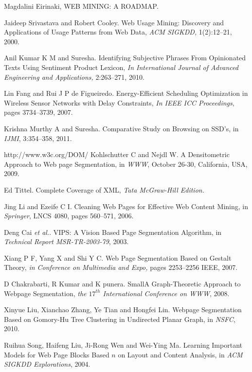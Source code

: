 \documentclass[fleqn,twoside]{article}
\begin{document}
\begin{thebibliography}{00}
Magdalini Eirinaki, WEB MINING: A ROADMAP.

{Jaideep Srivastava and Robert Cooley}. {Web Usage Mining: Discovery and Applications of Usage Patterns from Web Data}, {\it ACM SIGKDD,} 1(2):12--21,  2000.

{Anil Kumar K M and  Suresha}.
{Identifying Subjective Phrases From Opinionated Texts Using Sentiment Product Lexicon}, {\it In International Journal of Advanced Engineering and Applications,} 2:263--271, 2010.

{Lin Fang and Rui J P de Figueiredo}. Energy-Efficient Scheduling Optimization in Wireless Sensor Networks with Delay Constraints, {\it In IEEE ICC Proceedings}, pages 3734--3739, 2007.

{Krishna Murthy A and Suresha}. {Comparative Study on Browsing on SSD's}, in \emph{IJMI}, 3:354--358, 2011.

http://www.w3c.org/DOM/
{Kohlschutter C and Nejdl W}. {A Densitometric Approach to Web page Segmentation}, in \emph{WWW}, October 26-30,  California, USA, 2009.


Ed Tittel. Complete Coverage of XML, {\it Tata McGraw-Hill Edition.}

{Jing Li and Ezeife C I}. {Cleaning Web Pages for Effective Web Content Mining}, in \emph{Springer}, LNCS 4080, pages 560--571, 2006.



{Deng Cai {\it et al.}}. {VIPS: A Vision Based Page Segmentation Algorithm}, in \emph{Technical Report MSR-TR-2003-79}, 2003.

{Xiang P F, Yang X and Shi Y C}. {Web Page Segmentation Based on Gestalt Theory}, \emph{in Conference on Multimedia and Expo,} pages 2253--2256 IEEE, 2007.

{D Chakrabarti, R Kumar and K punera}. {SmallA Graph-Theoretic Approach to Webpage Segmentation}, \emph{the $17^{th}$ International Conference on WWW}, 2008.



{Xinyue Liu, Xianchao Zhang, Ye Tian and Hongfei Lin}. {Webpage Segmentation Based on Gomory-Hu Tree Clustering in Undirected Planar Graph}, in \emph{NSFC}, 2010.




{Ruihua Song, Haifeng Liu, Ji-Rong Wen and  Wei-Ying Ma}. {Learning Important Models for Web Page Blocks Based $n$ on Layout and Content Analysis}, in \emph{ACM SIGKDD Explorations},  2004.


\end{thebibliography}
\end{document}
